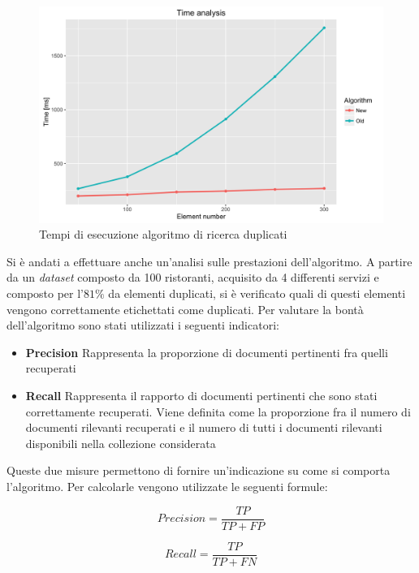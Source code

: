 \begin{figure}[ht]
	\centering
	\includegraphics[width=\textwidth]{3-metodologia-camus/Immagini/similarity_time_analysis.png}
	\caption{Tempi di esecuzione algoritmo di ricerca duplicati}\label{fig:tempo-esecuzione-algoritmo-duplicati}
\end{figure}

Si è andati a effettuare anche un'analisi sulle prestazioni dell'algoritmo. A partire da un \emph{dataset} composto da 100 ristoranti, acquisito da 4 differenti servizi e composto per l'$ 81\% $ da elementi duplicati, si è verificato quali di questi elementi vengono correttamente etichettati come duplicati. Per valutare la bontà dell'algoritmo sono stati utilizzati i seguenti indicatori:

\begin{itemize}
	\item \textbf{Precision} Rappresenta la proporzione di documenti pertinenti fra quelli recuperati
	\item \textbf{Recall} Rappresenta il rapporto di documenti pertinenti che sono stati correttamente recuperati. Viene definita come la proporzione fra il numero di documenti rilevanti recuperati e il numero di tutti i documenti rilevanti disponibili nella collezione considerata
\end{itemize}

Queste due misure permettono di fornire un'indicazione su come si comporta l'algoritmo. Per calcolarle vengono utilizzate le seguenti formule:

\begin{center}
	\begin{minipage}[t]{0.5\textwidth}
		\begin{equation*}
		Precision = \frac{TP}{TP + FP}
		\end{equation*}
	\end{minipage}%
	\begin{minipage}[t]{0.5\textwidth}
		\begin{equation*}
		Recall = \frac{TP}{TP + FN}
		\end{equation*}
	\end{minipage}
\end{center}

